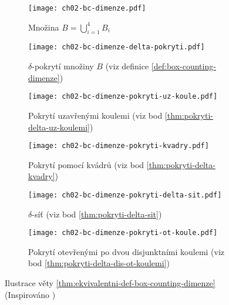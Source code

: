 \begin{figure}[h]
    \centering
    \begin{subfigure}{0.4\textwidth}
        \centering
        \texttt{[image: ch02-bc-dimenze.pdf]}
        \caption{Množina $B=\bigcup_{i=1}^4 B_i$}
        \label{subfig:bc-dimenze-pokryvana-mnozina}
    \end{subfigure}
    \qquad
    \begin{subfigure}{0.4\textwidth}
        \centering
        \texttt{[image: ch02-bc-dimenze-delta-pokryti.pdf]}
        \caption{$\delta$-pokrytí množiny $B$ (viz definice \ref{def:box-counting-dimenze})}
        \label{subfig:bc-dimenze-delta-pokryti}
    \end{subfigure}
    \qquad
    \begin{subfigure}{0.4\textwidth}
        \centering
        \texttt{[image: ch02-bc-dimenze-pokryti-uz-koule.pdf]}
        \caption{Pokrytí uzavřenými koulemi (viz bod \ref{thm:pokryti-delta-uz-koulemi})}
        \label{subfig:bc-dimenze-uz-koule}
    \end{subfigure}
    \qquad
    \begin{subfigure}{0.4\textwidth}
        \centering
        \texttt{[image: ch02-bc-dimenze-pokryti-kvadry.pdf]}
        \caption{Pokrytí pomocí kvádrů (viz bod \ref{thm:pokryti-delta-kvadry})}
        \label{subfig:bc-dimenze-kvadry}
    \end{subfigure}
    \qquad
    \begin{subfigure}{0.4\textwidth}
        \centering
        \texttt{[image: ch02-bc-dimenze-pokryti-delta-sit.pdf]}
        \caption{$\delta$-síť (viz bod \ref{thm:pokryti-delta-sit})}
        \label{subfig:bc-dimenze-delta-sit}
    \end{subfigure}
    \qquad
    \begin{subfigure}{0.4\textwidth}
        \centering
        \texttt{[image: ch02-bc-dimenze-pokryti-ot-koule.pdf]}
        \caption{Pokrytí otevřenými po dvou disjunktními koulemi (viz bod \ref{thm:pokryti-delta-dis-ot-koulemi})}
        \label{subfig:bc-dimenze-ot-koule}
    \end{subfigure}
    \caption{Ilustrace věty \ref{thm:ekvivalentni-def-box-counting-dimenze} (Inspirováno \citep[str. 29]{Falconer2014})}
    \label{fig:ilustrace-definic-bc-dimenze}
\end{figure}

